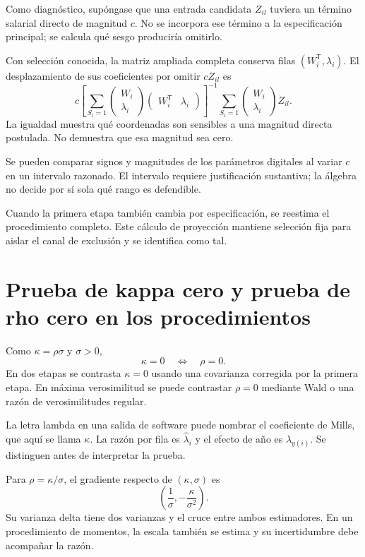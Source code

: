 \documentclass[11pt,a4paper]{article}
\begin{document}
Como diagnóstico, supóngase que una entrada candidata $Z_{il}$ tuviera un término salarial directo de magnitud $c$. No se incorpora ese término a la especificación principal; se calcula qué sesgo produciría omitirlo.

Con selección conocida, la matriz ampliada completa conserva filas
$(W_i^{\mathsf T},\lambda_i)$. El desplazamiento de sus coeficientes por omitir $cZ_{il}$ es
\[
c\left[\sum_{S_i=1}
\begin{pmatrix}W_i\\\lambda_i\end{pmatrix}
\begin{pmatrix}W_i^{\mathsf T}&\lambda_i\end{pmatrix}\right]^{-1}
\sum_{S_i=1}\begin{pmatrix}W_i\\\lambda_i\end{pmatrix}Z_{il}.
\]
La igualdad muestra qué coordenadas son sensibles a una magnitud directa postulada. No demuestra que esa magnitud sea cero.

Se pueden comparar signos y magnitudes de los parámetros digitales al variar $c$ en un intervalo razonado. El intervalo requiere justificación sustantiva; la álgebra no decide por sí sola qué rango es defendible.

Cuando la primera etapa también cambia por especificación, se reestima el procedimiento completo. Este cálculo de proyección mantiene selección fija para aislar el canal de exclusión y se identifica como tal.

\clearpage
\section{Prueba de kappa cero y prueba de rho cero en los procedimientos}

Como $\kappa=\rho\sigma$ y $\sigma>0$,
\[
\kappa=0\quad\Longleftrightarrow\quad\rho=0.
\]
En dos etapas se contrasta $\kappa=0$ usando una covarianza corregida por la primera etapa. En máxima verosimilitud se puede contrastar $\rho=0$ mediante Wald o una razón de verosimilitudes regular.

La letra lambda en una salida de software puede nombrar el coeficiente de Mills, que aquí se llama $\kappa$. La razón por fila es $\widehat\lambda_i$ y el efecto de año es $\lambda_{y(i)}$. Se distinguen antes de interpretar la prueba.

Para $\rho=\kappa/\sigma$, el gradiente respecto de $(\kappa,\sigma)$ es
\[
\left(\frac1\sigma,-\frac\kappa{\sigma^2}\right).
\]
Su varianza delta tiene dos varianzas y el cruce entre ambos estimadores. En un procedimiento de momentos, la escala también se estima y su incertidumbre debe acompañar la razón.
\end{document}
